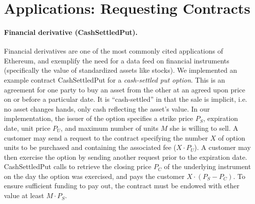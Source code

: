 \section{Applications: Requesting Contracts}

\paragraph{Financial derivative ({\sf CashSettledPut}).}
Financial derivatives are one of the most commonly cited applications of Ethereum,
and exemplify the need for a data feed on financial instruments (specifically the value of standardized assets like stocks).
We implemented an example contract {\sf CashSettledPut} for a {\em cash-settled put option}.
This is an agreement for one party to buy an asset from the other at an agreed upon price on or before a particular date.
It is ``cash-settled'' in that the sale is implicit, i.e. no asset changes hands, only cash reflecting the asset's value.
In our implementation, the issuer of the option specifies a strike price $P_S$, expiration date, unit price $P_U$, and maximum number of units $M$ she is willing to sell.
A customer may send a request to the contract specifying the number $X$ of option units to be purchased and containing the associated fee ($X \cdot P_U$).
A customer may then exercise the option by sending another request prior to the expiration date.
{\sf CashSettledPut} calls \tc to retrieve the closing price $P_C$ of the underlying instrument on the day the option was exercised, and pays the customer $X \cdot (P_S - P_C)$.
To ensure sufficient funding to pay out, the contract must be endowed with ether value at least $M \cdot P_S$.

\iffalse
\paragraph{Financial Derivatives.}  In order to implement a financial derivative as a smart contract, we require information about the corresponding financial instrument upon which the derivative depends (typically a stock).  As an example, we implemented a cash-settled put option.  The issuer of the option creates a contract for a particular stock, strike price, time period, unit price, and the maximum number of units he is willing to sell.  Customers may purchase the option by sending requests to the contract along with the associated fee indicating the number of units of the option they would like to buy.  Until the expiration date, customers may choose to exercise the put option by making another request to the option contract.  The contract then requests that TC retrieve the closing price of the underlying instrument on the day the option was exercised, and pays out to the customer the difference between the strike price and the closing price for each unit of the option purchased.  To ensure the contract always has sufficient funds to pay out, it must control value of at least the strike price times the maximum number of units sold.
\fi

